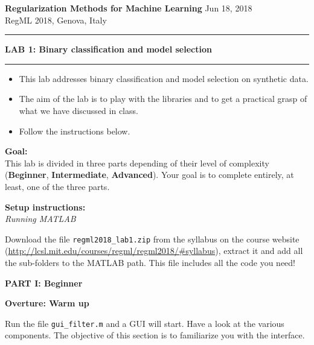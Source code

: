 \documentclass[DIN, pagenumber=false, fontsize=11pt, parskip=half]{scrartcl}
\newcommand{\mytitle}[1]{{\noindent\LARGE\textbf{#1}}}
\newcommand{\mysection}[1]{\noindent\large\textbf{#1}}
\begin{document}
\noindent\textbf{Regularization Methods for Machine Learning} \hfill Jun 18, 2018\\
RegML 2018, Genova, Italy \\ \rule{\textwidth}{1pt}

\mytitle{LAB 1: Binary classification and model selection}
\rule{\textwidth}{1pt}
\begin{itemize}\itemsep1pt \parskip0pt 
  \item This lab addresses binary classification and model selection on synthetic data.
  \item The aim of the lab is to play with the libraries and to get a practical grasp of what we have discussed in class.
  \item Follow the instructions below.

\end{itemize}

\begin{framed}
\textbf{\textbf{Goal}:} \\
This lab is divided in three parts depending of their level of complexity (\textbf{Beginner}, \textbf{Intermediate}, \textbf{Advanced}). Your goal is to complete entirely, at least, one of the three parts.
\end{framed}


\begin{framed}
\textbf{\textbf{Setup instructions}:} \\
\textit{Running MATLAB}

 Download the file \texttt{regml2018\_lab1.zip} from the syllabus on the course website (\url{http://lcsl.mit.edu/courses/regml/regml2018/\#syllabus}), extract it and add all the sub-folders to the MATLAB path. This file includes all the code you need!
\end{framed}

\pagebreak
\begin{center}
\large\textbf{PART I: Beginner}
\end{center}

\mysection{Overture: Warm up}

\noindent Run the file \texttt{gui\_filter.m} and a GUI will start. Have a look at the various components.
The objective of this section is to familiarize you with the interface.
\end{document}
